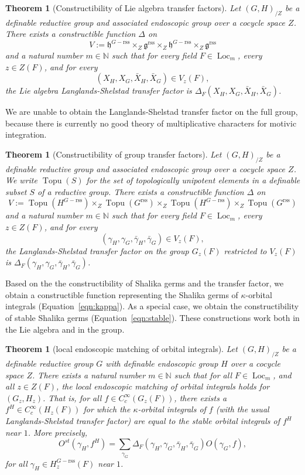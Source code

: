 \documentclass[12pt]{amsart}
\newcommand{\op}[1]{\operatorname{#1}}
\newcommand{\ring}[1]{{\mathbb #1}}
\newcommand{\fg}{\mathfrak{g}}
\newcommand{\fh}{\mathfrak{h}}
\newcommand{\reg}{\mathrm{rss}}
\theoremstyle{plain}
\newtheorem{theorem}[thm]{Theorem}
\theoremstyle{definition}
\begin{document}
\begin{theorem}[Constructibility of Lie algebra transfer
  factors]\label{thm:xfer-factor} 
Let
  $(G,H)_{/Z}$ be a definable reductive group and associated
  endoscopic group over a cocycle space $Z$.  There exists a
  constructible function $\Delta$ on
\begin{equation}\label{eqn:delta-domain}
V := \fh^{G-\reg}\times_Z
  \fg^\reg\times_Z
\fh^{G-\reg}\times_Z
  \fg^\reg
\end{equation}
and a natural number $m\in \ring{N}$ such that for every field $F\in
\op{Loc}_{m}$, every $z\in Z(F)$, and for every 
\[
(X_H,X_G,\bar X_H,\bar X_G)\in
V_z(F),\]  
the Lie algebra Langlands-Shelstad transfer factor is
$\Delta_F(X_H,X_G,\bar X_H,\bar X_G)$.
\end{theorem}

We are unable to obtain the Langlands-Shelstad
transfer factor on the full group, because there is currently no good
theory of multiplicative characters for motivic integration.

\begin{theorem}[Constructibility of group transfer factors] Let
  $(G,H)_{/Z}$ be a definable reductive group and associated
  endoscopic group over a cocycle space $Z$.  We write $\op{Topu}(S)$
  for the set of topologically unipotent elements in a definable
  subset $S$ of a reductive group.  There exists a constructible
  function $\Delta$ on
\[
V := \op{Topu}(H^{G-\reg})\times_Z
  \op{Topu}(G^\reg)\times_Z
\op{Topu}(H^{G-\reg})\times_Z
  \op{Topu}(G^\reg)
\] 
and a natural number $m\in \ring{N}$ such that for every field $F\in
\op{Loc}_{m}$, every $z\in Z(F)$, and for every 
\[
(\gamma_H,\gamma_G,\bar \gamma_H,\bar \gamma_G)\in V_z(F),\] the
Langlands-Shelstad transfer factor on the group $G_z(F)$ restricted to
$V_z(F)$ is $\Delta_F(\gamma_H,\gamma_G,\bar \gamma_H,\bar
\gamma_G)$.
\end{theorem}

Based on the the constructibility of Shalika germs and the transfer
factor, we obtain a constructible function representing the Shalika
germs of $\kappa$-orbital integrals (Equation~\ref{eqn:kappa}).  As a
special case, we obtain the constructibility of stable Shalika germs
(Equation~\ref{eqn:stable}).  These constructions work both in the Lie
algebra and in the group.

\begin{theorem}[local endoscopic matching of orbital integrals]\label{thm:local}
  Let $(G,H)_{/Z}$ be a definable reductive group $G$ with definable
  endoscopic group $H$ over a cocycle space $Z$.  There exists a
  natural number $m\in \ring{N}$ such that for all $F\in
  \op{Loc}_{m}$, and all $z\in Z(F)$, the local endoscopic matching of
  orbital integrals holds for $(G_z,H_z)$.  That is, for all $f\in
  C_c^\infty(G_z(F))$, there exists a $f^H\in C_c^\infty(H_z(F))$ for
  which the $\kappa$-orbital integrals of $f$ (with the usual
  Langlands-Shelstad transfer factor) are equal to the stable orbital
  integrals of $f^H$ near $1$. More precisely,
\[
O^{st}(\gamma_H,f^H) = \sum_{\gamma_G} \Delta_F(\gamma_H,\gamma_G,\bar
\gamma_H,\bar \gamma_G) O(\gamma_G,f),
\]
for all $\gamma_H\in H^{G-\reg}_z(F)$ near $1$.
\end{theorem}
\end{document}
